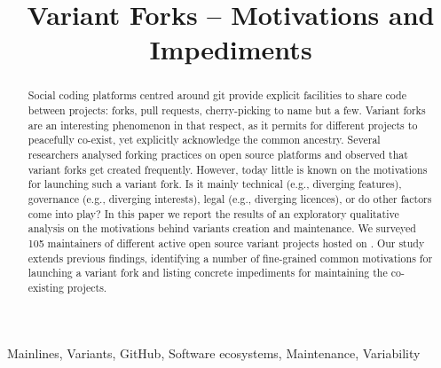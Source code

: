 

\pagestyle{fancy}
\fancyhead[r]{\thepage}




\title{Variant Forks -- Motivations and Impediments}

\author{
	}




\maketitle

\begin{abstract}
Social coding platforms centred around git provide explicit facilities to share code between projects: forks, pull requests, cherry-picking to name but a few.
Variant forks are an interesting phenomenon in that respect, as it permits for different projects to peacefully co-exist, yet explicitly acknowledge the common ancestry.
Several researchers analysed forking practices on open source platforms and observed that variant forks get created frequently.
However, today little is known on the motivations for launching such a variant fork.
Is it mainly technical (e.g., diverging features), governance (e.g., diverging interests), legal (e.g., diverging licences), or do other factors come into play?
In this paper we report the results of an exploratory qualitative analysis on the motivations behind variants creation and maintenance.
We surveyed 105 maintainers of different active open source variant projects hosted on \gh.
Our study extends previous findings, identifying a number of fine-grained common motivations for launching a variant fork and listing concrete impediments for maintaining the co-existing projects.
\end{abstract}

\begin{IEEEkeywords}
Mainlines, Variants, GitHub, Software ecosystems, Maintenance, Variability
\end{IEEEkeywords}



% 






\typeout{}



